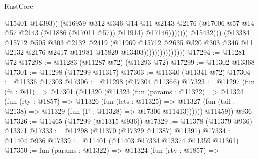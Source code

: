 \begin{lexlean}{RustCore}
\begin{coremodule}
                                                    @15401
                                                    @14393))
                                                (@16959
                                                  @312
                                                  @346
                                                  @14
                                                  @11
                                                  @2143
                                                  @2176
                                                  (@17006
                                                    @57
                                                    @14
                                                    @57
                                                    @2143
                                                    (@11886 (@17011 @57))
                                                    @11914)
                                                  @17146)))))))
                                    @15432)))
                              (@13384
                                @15712
                                @505
                                @303
                                @2132
                                @2419
                                (@11969
                                  @15712
                                  @2635
                                  @320
                                  @303
                                  @346
                                  @11
                                  @2132
                                  @2176
                                  @2417
                                  @11981
                                  @15829
                                  @13403)))))))))))))))
@17294 := @11281 @72
@17298 := @11283 (@11287 @72) (@11293 @72)
@17299 := @11302 @13368
@17301 := @11298 (@17299 @11317)
@17303 := @11340 (@11341 @72)
@17304 := @11336 @17303
@17306 := @11298 (@17304 @11366)
@17323 := @11297
    (fun (fn : @41) =>
    @17301
      (@11320
        (@11323
          (fun (params : @11322) =>
          @11324
            (fun (rty : @1857) =>
            @11326
              (fun (lets : @11325) =>
              @11327 (fun (tail : @2138) => @11329 (fun (Γ : @11328) => @17306 @11413))))))
        @11459))
    @936
@17326 := @11465 (@17299 (@11315 @936))
@17329 := @11378 (@11379 @936) @13371
@17333 := @11298 (@11370 (@17329 @11387) @11391)
@17334 := @11404 @936
@17339 := @11401 (@11403 @17334 @13374 @11359 @11361)
@17350 := fun (params : @11322) =>
  @11324
    (fun (rty : @1857) =>

\end{coremodule}
\end{lexlean}
